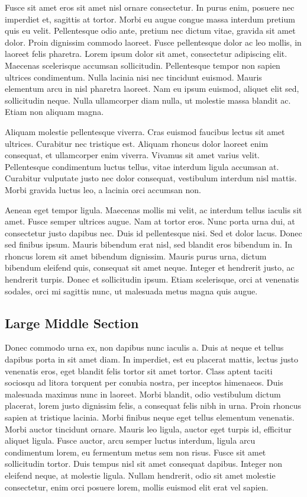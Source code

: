 \documentclass[twocolumn,10pt]{article}
\begin{document}
Fusce sit amet eros sit amet nisl ornare consectetur. In purus enim, posuere nec imperdiet et, sagittis at tortor. Morbi eu augue congue massa interdum pretium quis eu velit. Pellentesque odio ante, pretium nec dictum vitae, gravida sit amet dolor. Proin dignissim commodo laoreet. Fusce pellentesque dolor ac leo mollis, in laoreet felis pharetra. Lorem ipsum dolor sit amet, consectetur adipiscing elit. Maecenas scelerisque accumsan sollicitudin. Pellentesque tempor non sapien ultrices condimentum. Nulla lacinia nisi nec tincidunt euismod. Mauris elementum arcu in nisl pharetra laoreet. Nam eu ipsum euismod, aliquet elit sed, sollicitudin neque. Nulla ullamcorper diam nulla, ut molestie massa blandit ac. Etiam non aliquam magna.

Aliquam molestie pellentesque viverra. Cras euismod faucibus lectus sit amet ultrices. Curabitur nec tristique est. Aliquam rhoncus dolor laoreet enim consequat, et ullamcorper enim viverra. Vivamus sit amet varius velit. Pellentesque condimentum luctus tellus, vitae interdum ligula accumsan at. Curabitur vulputate justo nec dolor consequat, vestibulum interdum nisl mattis. Morbi gravida luctus leo, a lacinia orci accumsan non.

Aenean eget tempor ligula. Maecenas mollis mi velit, ac interdum tellus iaculis sit amet. Fusce semper ultrices augue. Nam at tortor eros. Nunc porta urna dui, at consectetur justo dapibus nec. Duis id pellentesque nisi. Sed et dolor lacus. Donec sed finibus ipsum. Mauris bibendum erat nisl, sed blandit eros bibendum in. In rhoncus lorem sit amet bibendum dignissim. Mauris purus urna, dictum bibendum eleifend quis, consequat sit amet neque. Integer et hendrerit justo, ac hendrerit turpis. Donec et sollicitudin ipsum. Etiam scelerisque, orci at venenatis sodales, orci mi sagittis nunc, ut malesuada metus magna quis augue. 

\subsection*{Large Middle Section}
Donec commodo urna ex, non dapibus nunc iaculis a. Duis\cite{texbook} at neque et tellus dapibus porta in sit amet diam. In imperdiet, est eu placerat mattis, lectus justo venenatis eros, eget blandit felis tortor sit amet tortor. Class aptent taciti sociosqu ad litora torquent per conubia nostra, per inceptos himenaeos. Duis malesuada maximus nunc in laoreet. Morbi blandit, odio vestibulum dictum placerat, lorem justo dignissim felis, a consequat felis nibh in urna. Proin rhoncus sapien at tristique lacinia. Morbi finibus neque eget tellus elementum venenatis. Morbi auctor tincidunt ornare. Mauris leo ligula, auctor eget turpis id, efficitur aliquet ligula. Fusce auctor, arcu semper luctus interdum, ligula arcu condimentum lorem, eu fermentum metus sem non risus. Fusce sit amet sollicitudin tortor. Duis tempus nisl sit amet consequat dapibus. Integer non eleifend neque, at molestie ligula. Nullam hendrerit, odio sit amet molestie consectetur, enim orci posuere lorem, mollis euismod elit erat vel sapien.
\end{document}
